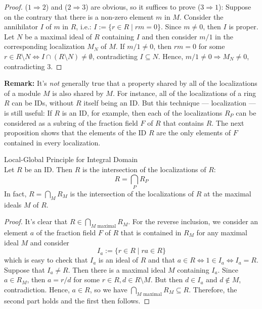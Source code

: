\begin{proof}
    ($1 \Rightarrow 2$) and ($2 \Rightarrow 3$) are obvious, so it suffices to prove ($3 \Rightarrow 1$): Suppose on the contrary that there is a non-zero element $m$ in $M$. Consider the annihilator $I$ of $m$ in $R$, i.e.: $I:=\{ r\in R \mid rm=0\}$. Since $m\neq 0$, then $I$ is proper. Let $N$ be a maximal ideal of $R$ containing $I$ and then consider $m/1$ in the corresponding localization $M_N$ of $M$. If $m/1 \neq 0$, then $rm=0$ for some $r \in R \setminus N \Leftrightarrow I \cap (R\setminus N) \neq \emptyset$, contradicting $I \subseteq N$. Hence, $m/1 \neq 0 \Rightarrow M_N \neq 0$, contradicting 3.
\end{proof}

\noindent\textbf{Remark:} It's \textit{not} generally true that a property shared by all of the localizations of a module $M$ is also shared by $M$. For instance, all of the localizations of a ring $R$ can be IDs, without $R$ itself being an ID. But this technique --- localization --- is still useful: If $R$ is an ID, for example, then each of the localizations $R_P$ can be considered as a subring of the fraction field $F$ of $R$ that contains $R$. The next proposition shows that the elements of the ID $R$ are the only elements of $F$ contained in every localization.

\begin{proposition}{Local-Global Principle for Integral Domain}\\
Let $R$ be an ID. Then $R$ is the intersection of the localizations of $R$:
$$R= \bigcap_P R_P$$
In fact, $R=\bigcap_M R_M$ is the intersection of the localizations of $R$ at the maximal ideals $M$ of $R$.
\end{proposition}

\begin{proof}
    It's clear that $R \in \bigcap_{M \text{ maximal}} R_M$. For the reverse inclusion, we consider an element $a$ of the fraction field $F$ of $R$ that is contained in $R_M$ for any maximal ideal $M$ and consider
    $$I_a:= \{r\in R\mid ra\in R\}$$
    which is easy to check that $I_a$ is an ideal of $R$ and that $a\in R \Leftrightarrow 1\in I_a \Leftrightarrow I_a =R$. Suppose that $I_a \neq R$. Then there is a maximal ideal $M$ containing $I_a$. Since $a \in R_M$, then $a=r/d$ for some $r\in R,d\in R\setminus M$. But then $d\in I_a$ and $d\notin M$, contradiction. Hence, $a\in R$, so we have $\bigcap_{M \text{ maximal}} R_M \subseteq R$. Therefore, the second part holds and the first then follows.
\end{proof}


